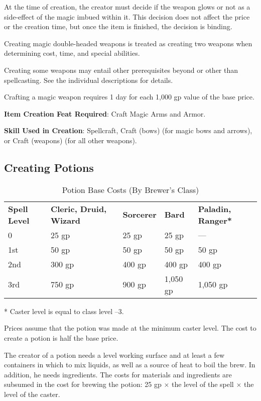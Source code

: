 At the time of creation, the creator must decide if the weapon glows or not as a side-effect of the magic imbued within it. This decision does not affect the price or the creation time, but once the item is finished, the decision is binding.
				
Creating magic double-headed weapons is treated as creating two weapons when determining cost, time, and special abilities.
				
Creating some weapons may entail other prerequisites beyond or other than spellcasting. See the individual descriptions for details.
				
Crafting a magic weapon requires 1 day for each 1,000 gp value of the base price.
				
\textbf{Item Creation Feat Required}: Craft Magic Arms and Armor.
				
\textbf{Skill Used in Creation}: Spellcraft, Craft (bows) (for magic bows and arrows), or Craft (weapons) (for all other weapons).
				
\subsection{Creating Potions}


\begin{table}[]
\sffamily
\caption{Potion Base Costs (By Brewer's Class)}
\begin{tabular}{lllll}
\textbf{Spell Level} & \textbf{Cleric, Druid, Wizard} & \textbf{Sorcerer} & \textbf{Bard} & \textbf{Paladin, Ranger*} \\
0                    & 25 gp                          & 25 gp             & 25 gp         & —                         \\
1st                  & 50 gp                          & 50 gp             & 50 gp         & 50 gp                     \\
2nd                  & 300 gp                         & 400 gp            & 400 gp        & 400 gp                    \\
3rd                  & 750 gp                         & 900 gp            & 1,050 gp      & 1,050 gp                 
\end{tabular}
* Caster level is equal to class level --3.
\end{table}

Prices assume that the potion was made at the minimum caster level. The cost to create a potion is half the base price.

				
The creator of a potion needs a level working surface and at least a few containers in which to mix liquids, as well as a source of heat to boil the brew. In addition, he needs ingredients. The costs for materials and ingredients are subsumed in the cost for brewing the potion: 25 gp \mbox{$\times$} the level of the spell \mbox{$\times$} the level of the caster.
				
